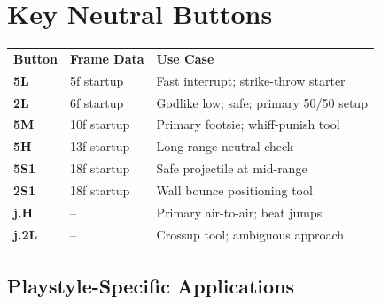 \documentclass[12pt, a4paper]{report}
\newcommand{\movename}[1]{\textbf{\textcolor{ahriGold}{#1}}}
\begin{document}
\section{Key Neutral Buttons}

\begin{center}
\begin{tabular}{L{3.5cm} L{3.5cm} L{6cm}}
\textcolor{ahriCyan}{\textbf{Button}} & \textcolor{ahriCyan}{\textbf{Frame Data}} & \textcolor{ahriCyan}{\textbf{Use Case}} \\
\movename{5L} & 5f startup & Fast interrupt; strike-throw starter \\
\movename{2L} & 6f startup & Godlike low; safe; primary 50/50 setup \\
\movename{5M} & 10f startup & Primary footsie; whiff-punish tool \\
\movename{5H} & 13f startup & Long-range neutral check \\
\movename{5S1} & 18f startup & Safe projectile at mid-range \\
\movename{2S1} & 18f startup & Wall bounce positioning tool \\
\movename{j.H} & -- & Primary air-to-air; beat jumps \\
\movename{j.2L} & -- & Crossup tool; ambiguous approach \\
\end{tabular}
\end{center}

\subsection{Playstyle-Specific Applications}
\end{document}
